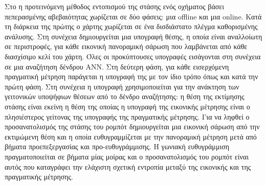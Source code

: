 Στο \cite{Wang2021a} η προτεινόμενη μέθοδος εντοπισμού της στάσης ενός
οχήματος βάσει πεπερασμένης αβεβαιότητας χωρίζεται σε δύο φάσεις: μια offline
και μια online. Κατά τη διάρκεια της πρώτης ο χάρτης χωρίζεται σε ένα
δισδιάστατο πλέγμα καθορισμένης ανάλυσης. Στη συνέχεια δημιουργείται μια
υπογραφή θέσης, η οποία είναι αναλλοίωτη σε περιστροφές, για κάθε εικονική
πανοραμική σάρωση που λαμβάνεται από κάθε διασχίσιμο κελί του χάρτη. Όλες οι
προκύπτουσες υπογραφές εισάγονται στη συνέχεια σε μια αναζήτηση δένδρου ANN.
Στη δεύτερη φάση, για κάθε εισερχόμενη πραγματική μέτρηση παράγεται η υπογραφή
της με τον ίδιο τρόπο όπως και κατά την πρώτη φάση. Στη συνέχεια η υπογραφή
χρησιμοποιείται για την ανάκτηση των γειτονικών υποψήφιων θέσεων από το δένδρο
αναζήτησης: η θέση της εκτίμησης στάσης είναι εκείνη η θέση της οποίας η
υπογραφή της εικονικής μέτρησης είναι ο πλησιέστερος γείτονας της υπογραφής της
πραγματικής μέτρησης.  Για να ληφθεί ο προσανατολισμός της στάσης του ρομπότ
δημιουργείται μια εικονική σάρωση από την εκτιμώμενη θέση και η οποία
ευθυγραμμίζεται με την πανοραμική μέτρηση μετά από βήματα προεπεξεργασίας και
προ-ευθυγράμμισης. Η γωνιακή ευθυγράμμιση πραγματοποιείται σε βήματα μίας
μοίρας και ο προσανατολισμός του ρομπότ είναι αυτός που καταγράφει την ελάχιστη
σχετική εντροπία μεταξύ της εικονικής και της πραγματικής μέτρησης.
